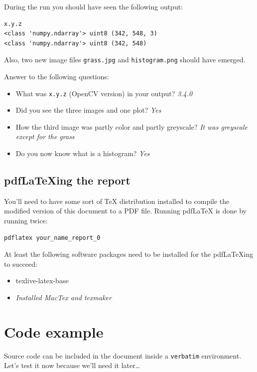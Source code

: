 \documentclass{article}
\begin{document}
During the run you should have seen the following output:

\begin{verbatim}
x.y.z
<class 'numpy.ndarray'> uint8 (342, 548, 3)
<class 'numpy.ndarray'> uint8 (342, 548)
\end{verbatim}

Also, two new image files \texttt{grass.jpg} and
\texttt{histogram.png} should have emerged.

Answer to the following questions:

\begin{itemize}
\item What was \texttt{x.y.z} (OpenCV version) in your output? \emph{3.4.0}
\item Did you see the three images and one plot? \emph{Yes}
\item How the third image was partly color and partly greyscale? \emph{It was greyscale except for the grass}
\item Do you now know what is a histogram? \emph{Yes}
\end{itemize}


\subsection{pdf\LaTeX{}ing the report}

You'll need to have some sort of \TeX{} distribution installed to
compile the modified version of this document to a PDF file.  Running
pdf\LaTeX{} is done by running twice:

\begin{verbatim}
pdflatex your_name_report_0
\end{verbatim}

At least the following software packages need to be installed for the
pdf\LaTeX{}ing to succeed:

\begin{itemize}
\item texlive-latex-base
\item \emph{Installed MacTex and texmaker}
\end{itemize}


\section{Code example}
\label{sec:code}

Source code can be included in the document inside a \texttt{verbatim}
environment.  Let's test it now because we'll need it later\ldots
\end{document}
